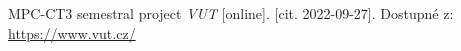 \begin{thebibliography}{99}

MPC-CT3 semestral project \textit{VUT} [online]. [cit. 2022-09-27]. Dostupné z: \url{https://www.vut.cz/}

\end{thebibliography}